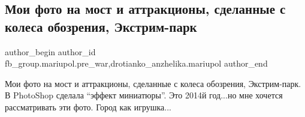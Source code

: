 
 
 
 
 

\subsection{Мои фото на мост и аттракционы, сделанные с колеса обозрения, Экстрим-парк}
\label{sec:23_01_2023.fb.fb_group.mariupol.pre_war.4.moi_foto_na_most_i_a}
 
\ifcmt
 author_begin
   author_id fb_group.mariupol.pre_war,drotianko_anzhelika.mariupol
 author_end
\fi

Мои фото на мост и аттракционы, сделанные с колеса обозрения, Экстрим-парк. В
PhotoShop сделала \enquote{эффект миниатюры}. Это 2014й год...но мне хочется
рассматривать эти фото. Город как игрушка...

